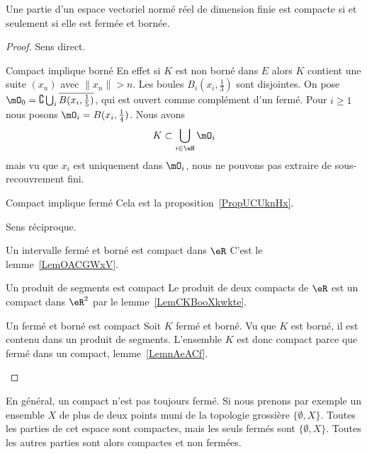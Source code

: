 \begin{theorem} \label{ThoXTEooxFmdI}
    Une partie d'un espace vectoriel normé réel de dimension finie est compacte si et seulement si elle est fermée et bornée.
\end{theorem}

\begin{proof}
    Sens direct.
    \begin{subproof}
    \item[Compact implique borné]
        En effet si \( K\) est non borné dans \( E\) alors \( K\) contient une suite \( (x_n)\) avec \( \| x_n \|>n\). Les boules \( B_i(x_i,\frac{ 1 }{3})\) sont disjointes. On pose \( \mO_0=\complement\bigcup_i\overline{ B(x_i,\frac{1}{ 5 }) }\), qui est ouvert comme complément d'un fermé. Pour \( i\geq 1\) nous posons \( \mO_i=B(x_i,\frac{1}{ 4 })\). Nous avons
        \begin{equation}
            K\subset\bigcup_{i\in \eN}\mO_i
        \end{equation}
        mais vu que \( x_i\) est uniquement dans \( \mO_i\), nous ne pouvons pas extraire de sous-recouvrement fini.
    \item[Compact implique fermé]
        Cela est la proposition~\ref{PropUCUknHx}.
    \end{subproof}
    Sens réciproque.
    \begin{subproof}
    \item[Un intervalle fermé et borné est compact dans \( \eR\)]
        C'est le lemme~\ref{LemOACGWxV}.
    \item[Un produit de segments est compact]
        Le produit de deux compacts de \( \eR\) est un compact dans \( \eR^2\) par le lemme~\ref{LemCKBooXkwkte}.
    \item[Un fermé et borné est compact]
        Soit \( K\) fermé et borné. Vu que \( K\) est borné, il est contenu dans un produit de segments. L'ensemble \( K\) est donc compact parce que fermé dans un compact, lemme~\ref{LemnAeACf}.
    \end{subproof}
\end{proof}

\begin{example}
    En général, un compact n'est pas toujours fermé. Si nous prenons par exemple un ensemble \( X\) de plus de deux points muni de la topologie grossière \( \{ \emptyset,X \}\). Toutes les parties de cet espace sont compactes, mais les seuls fermés sont \( \{ \emptyset,X \}\). Toutes les autres parties sont alors compactes et non fermées.
\end{example}


